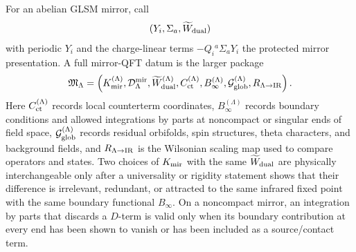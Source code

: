 \begin{definition}
\label{def:glsm-mirror-full-qft-datum}
For an abelian GLSM mirror, call
\[
  (Y_i,\Sigma_a,\widetilde W_{\rm dual})
\]
with periodic \(Y_i\) and the charge-linear terms
\(-Q_i{}^a\Sigma_aY_i\) the protected mirror presentation.  A full mirror-QFT
datum is the larger package
\[
  \mathfrak M_\Lambda
  =
  \left(
  K_{\rm mir}^{(\Lambda)},
  {\mathcal D}^{\rm mir}_{\Lambda},
  \widetilde W_{\rm dual}^{(\Lambda)},
  C_{\rm ct}^{(\Lambda)},
  B_{\infty}^{(\Lambda)},
  {\mathcal G}_{\rm glob}^{(\Lambda)},
  R_{\Lambda\to{\rm IR}}
  \right).
\]
Here \(C_{\rm ct}^{(\Lambda)}\) records local counterterm coordinates,
\(B_{\infty}^{(\Lambda)}\) records boundary conditions and allowed integrations
by parts at noncompact or singular ends of field space,
\({\mathcal G}_{\rm glob}^{(\Lambda)}\) records residual orbifolds, spin
structures, theta characters, and background fields, and
\(R_{\Lambda\to{\rm IR}}\) is the Wilsonian scaling map used to compare
operators and states.  Two choices of \(K_{\rm mir}\) with the same
\(\widetilde W_{\rm dual}\) are physically interchangeable only after a
universality or rigidity statement shows that their difference is irrelevant,
redundant, or attracted to the same infrared fixed point with the same
boundary functional \(B_\infty\).  On a noncompact mirror, an integration by
parts that discards a \(D\)-term is valid only when its boundary contribution
at every end has been shown to vanish or has been included as a source/contact
term.
\end{definition}

